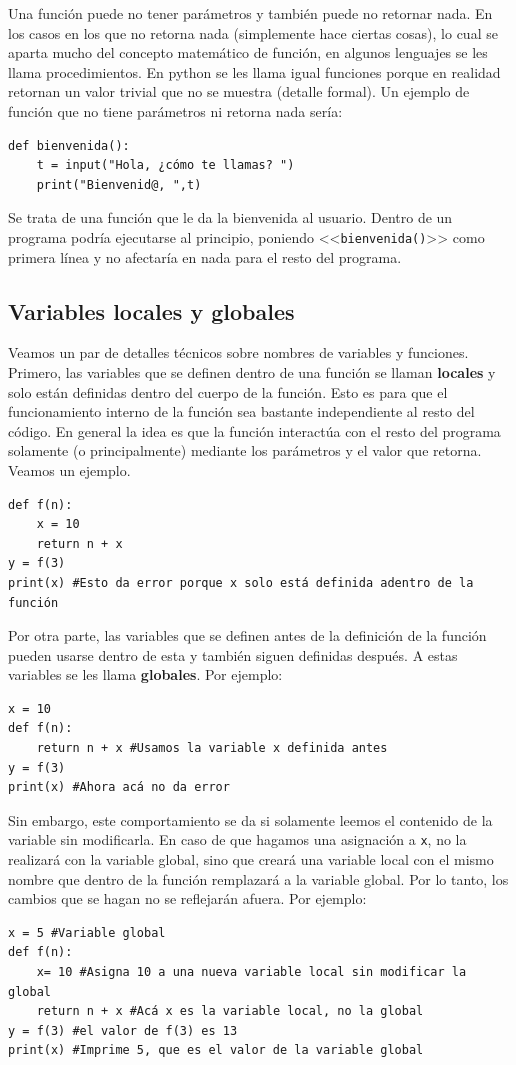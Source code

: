 \documentclass[a4paper, 12pt]{report}
\theoremstyle{definition}
\begin{document}
Una función puede no tener parámetros y también puede no retornar nada. En los casos en los que no retorna nada (simplemente hace ciertas cosas), lo cual se aparta mucho del concepto matemático de función, en algunos lenguajes se les llama procedimientos. En python se les llama igual funciones porque en realidad retornan un valor trivial que no se muestra (detalle formal). Un ejemplo de función que no tiene parámetros ni retorna nada sería:
\begin{verbatim}
def bienvenida():
    t = input("Hola, ¿cómo te llamas? ")
    print("Bienvenid@, ",t)
\end{verbatim}
Se trata de una función que le da la bienvenida al usuario. Dentro de un programa podría ejecutarse al principio, poniendo <<{\tt bienvenida()}>> como primera línea y no afectaría en nada para el resto del programa.

\subsection{Variables locales y globales}
Veamos un par de detalles técnicos sobre nombres de variables y funciones. Primero, las variables que se definen dentro de una función se llaman {\bf locales} y solo están definidas dentro del cuerpo de la función. Esto es para que el funcionamiento interno de la función sea bastante independiente al resto del código. En general la idea es que la función interactúa con el resto del programa solamente (o principalmente) mediante los parámetros y el valor que retorna. Veamos un ejemplo.
\begin{verbatim}
def f(n):
    x = 10
    return n + x
y = f(3)
print(x) #Esto da error porque x solo está definida adentro de la función
\end{verbatim}

Por otra parte, las variables que se definen antes de la definición de la función pueden usarse dentro de esta y también siguen definidas después. A estas variables se les llama {\bf globales}. Por ejemplo:
\begin{verbatim}
x = 10
def f(n):
    return n + x #Usamos la variable x definida antes
y = f(3)
print(x) #Ahora acá no da error
\end{verbatim}
Sin embargo, este comportamiento se da si solamente leemos el contenido de la variable sin modificarla. En caso de que hagamos una asignación a {\tt x}, no la realizará con la variable global, sino que creará una variable local con el mismo nombre que dentro de la función remplazará a la variable global. Por lo tanto, los cambios que se hagan no se reflejarán afuera. Por ejemplo:
\begin{verbatim}
x = 5 #Variable global
def f(n):
    x= 10 #Asigna 10 a una nueva variable local sin modificar la global
    return n + x #Acá x es la variable local, no la global
y = f(3) #el valor de f(3) es 13
print(x) #Imprime 5, que es el valor de la variable global
\end{verbatim}
\end{document}
